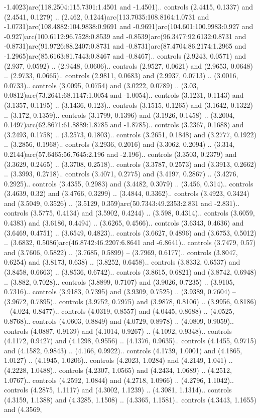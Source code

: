 -1.4023)arc(118.2504:115.7301:1.4501 and -1.4501).. controls (2.4415, 0.1337) and (2.4541, 0.1279) .. (2.462, 0.1244)arc(113.7035:108.8164:1.0731 and -1.0731)arc(108.4882:104.9838:0.9691 and -0.9691)arc(104.601:100.9983:0.927 and -0.927)arc(100.6112:96.7528:0.8539 and -0.8539)arc(96.3477:92.6132:0.8731 and -0.8731)arc(91.9726:88.2407:0.8731 and -0.8731)arc(87.4704:86.2174:1.2965 and -1.2965)arc(85.6163:81.7443:0.8467 and -0.8467).. controls (2.9243, 0.0571) and (2.937, 0.0592) .. (2.9448, 0.0606).. controls (2.9527, 0.0621) and (2.9653, 0.0648) .. (2.9733, 0.0665).. controls (2.9811, 0.0683) and (2.9937, 0.0713) .. (3.0016, 0.0733).. controls (3.0095, 0.0754) and (3.0222, 0.0789) .. (3.03, 0.0812)arc(73.2641:68.1147:1.0054 and -1.0054).. controls (3.1231, 0.1143) and (3.1357, 0.1195) .. (3.1436, 0.123).. controls (3.1515, 0.1265) and (3.1642, 0.1322) .. (3.172, 0.1359).. controls (3.1799, 0.1396) and (3.1926, 0.1458) .. (3.2004, 0.1497)arc(62.8671:61.8889:1.8785 and -1.8785).. controls (3.2367, 0.1688) and (3.2493, 0.1758) .. (3.2573, 0.1803).. controls (3.2651, 0.1848) and (3.2777, 0.1922) .. (3.2856, 0.1968).. controls (3.2936, 0.2016) and (3.3062, 0.2094) .. (3.314, 0.2144)arc(57.6465:56.7645:2.196 and -2.196).. controls (3.3503, 0.2379) and (3.3629, 0.2465) .. (3.3708, 0.2518).. controls (3.3787, 0.2573) and (3.3913, 0.2662) .. (3.3993, 0.2718).. controls (3.4071, 0.2775) and (3.4197, 0.2867) .. (3.4276, 0.2925).. controls (3.4355, 0.2983) and (3.4482, 0.3079) .. (3.456, 0.314).. controls (3.4639, 0.32) and (3.4766, 0.3299) .. (3.4844, 0.3362).. controls (3.4923, 0.3424) and (3.5049, 0.3526) .. (3.5129, 0.359)arc(50.7343:49.2353:2.831 and -2.831).. controls (3.5775, 0.4134) and (3.5902, 0.4244) .. (3.598, 0.4314).. controls (3.6059, 0.4383) and (3.6186, 0.4494) .. (3.6265, 0.4566).. controls (3.6343, 0.4636) and (3.6469, 0.4751) .. (3.6549, 0.4823).. controls (3.6627, 0.4896) and (3.6753, 0.5012) .. (3.6832, 0.5086)arc(46.8742:46.2207:6.8641 and -6.8641).. controls (3.7479, 0.57) and (3.7606, 0.5822) .. (3.7685, 0.5899) -- (3.7969, 0.6177).. controls (3.8047, 0.6254) and (3.8173, 0.638) .. (3.8252, 0.6458).. controls (3.8332, 0.6537) and (3.8458, 0.6663) .. (3.8536, 0.6742).. controls (3.8615, 0.6821) and (3.8742, 0.6948) .. (3.882, 0.7028).. controls (3.8899, 0.7107) and (3.9026, 0.7235) .. (3.9105, 0.7316).. controls (3.9183, 0.7395) and (3.9309, 0.7525) .. (3.9389, 0.7604) -- (3.9672, 0.7895).. controls (3.9752, 0.7975) and (3.9878, 0.8106) .. (3.9956, 0.8186) -- (4.024, 0.8477).. controls (4.0319, 0.8557) and (4.0445, 0.8688) .. (4.0525, 0.8768).. controls (4.0603, 0.8849) and (4.0729, 0.8978) .. (4.0809, 0.9059).. controls (4.0887, 0.9139) and (4.1014, 0.9267) .. (4.1092, 0.9348).. controls (4.1172, 0.9427) and (4.1298, 0.9556) .. (4.1376, 0.9635).. controls (4.1455, 0.9715) and (4.1582, 0.9843) .. (4.166, 0.9922).. controls (4.1739, 1.0001) and (4.1865, 1.0127) .. (4.1945, 1.0206).. controls (4.2023, 1.0284) and (4.2149, 1.041) .. (4.2228, 1.0488).. controls (4.2307, 1.0565) and (4.2434, 1.0689) .. (4.2512, 1.0767).. controls (4.2592, 1.0844) and (4.2718, 1.0966) .. (4.2796, 1.1042).. controls (4.2875, 1.1117) and (4.3002, 1.1239) .. (4.3081, 1.1314).. controls (4.3159, 1.1388) and (4.3285, 1.1508) .. (4.3365, 1.1581).. controls (4.3443, 1.1655) and (4.3569, 